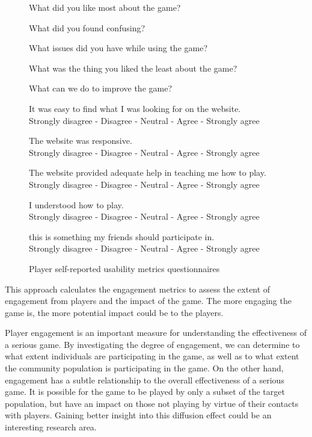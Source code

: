 \begin{figure}[ht!]
\begin{mybox}
\begin{compactenum}
\item What did you like most about the game?
\item What did you found confusing?
\item What issues did you have while using the game?
\item What was the thing you liked the least about the game?
\item What can we do to improve the game?
\item It was easy to find what I was looking for on the website.  \\
	Strongly disagree  -  Disagree  -  Neutral  -  Agree  -  Strongly agree
\item The website was responsive. \\
	Strongly disagree  -  Disagree  -  Neutral  -  Agree  -  Strongly agree
\item The website provided adequate help in teaching me how to play. \\
	Strongly disagree  -  Disagree  -  Neutral  -  Agree  -  Strongly agree
\item I understood how to play. \\
	Strongly disagree  -  Disagree  -  Neutral  -  Agree  -  Strongly agree
\item this is something my friends should participate in. \\
	Strongly disagree  -  Disagree  -  Neutral  -  Agree  -  Strongly agree
\end{compactenum}
\end{mybox}
\caption{Player self-reported usability metrics questionnaires}
\label{fig:usability-metrics}  
\end{figure}

\label{Engagement metrics}

This approach calculates the engagement metrics to assess the extent of engagement from players and 
the impact of the game. The more engaging the game is, the more potential impact could be to the players.

Player engagement is an important measure for understanding the effectiveness of a serious game.
By investigating the degree of engagement, we can determine to what extent individuals are
participating in the game, as well as to what extent the community population is participating in
the game. On the other hand, engagement has a subtle relationship to the overall effectiveness of a 
serious game. It is possible for the game to be played by only a subset of the target population, but
have an impact on those not playing by virtue of their contacts with players. Gaining
better insight into this diffusion effect could be an interesting research area. 

